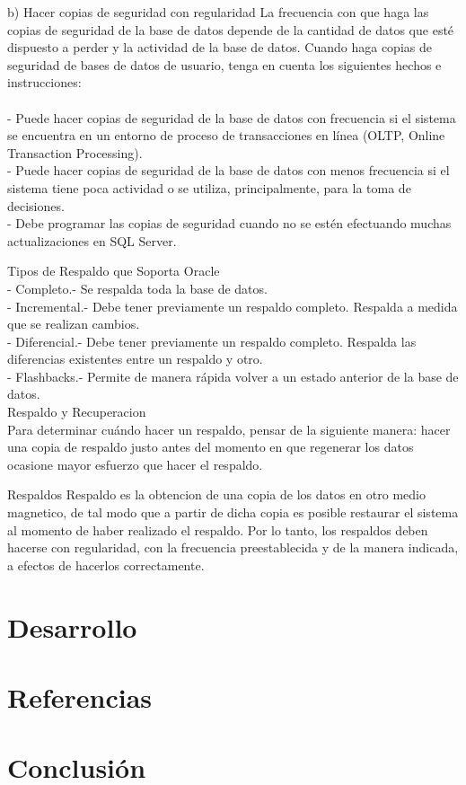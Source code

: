 \documentclass[a4paper,twocolumn,10pt]{article}
\begin{document}
b) Hacer copias de seguridad con regularidad
La frecuencia con que haga las copias de seguridad de la base de datos depende de la cantidad de datos que esté dispuesto a perder y la actividad de la base de datos. Cuando haga copias de seguridad de bases de datos de usuario, tenga en cuenta los siguientes hechos e instrucciones:
\\
\\- Puede hacer copias de seguridad de la base de datos con frecuencia si el sistema se encuentra en un entorno de proceso de transacciones en línea (OLTP, Online Transaction Processing).
\\-	Puede hacer copias de seguridad de la base de datos con menos frecuencia si el sistema tiene poca actividad o se utiliza, principalmente, para la toma de decisiones.
\\-	Debe programar las copias de seguridad cuando no se estén efectuando muchas actualizaciones en SQL Server.

 Tipos de Respaldo que Soporta Oracle
\\-	Completo.- Se respalda toda la base de datos.
\\-	Incremental.- Debe tener previamente un respaldo completo. Respalda a medida que se realizan cambios.
\\-	Diferencial.- Debe tener previamente un respaldo completo. Respalda las diferencias existentes entre un respaldo y otro.
\\-	Flashbacks.- Permite de manera rápida volver a un estado anterior de la base de datos.
	\\ Respaldo y Recuperacion
\\Para determinar cuándo hacer un respaldo, pensar de la siguiente manera: hacer una copia de respaldo justo antes del momento en que regenerar los datos ocasione mayor esfuerzo que hacer el respaldo.

	Respaldos
Respaldo es la obtencion de una copia de los datos en otro medio magnetico, de tal modo que a partir de dicha copia es posible restaurar el sistema al momento de haber realizado el respaldo. Por lo tanto, los respaldos deben hacerse con regularidad, con la frecuencia preestablecida y de la manera indicada, a efectos de hacerlos correctamente.
\\

\section{Desarrollo}
\section{Referencias}
\section{Conclusi\'on}
\end{document}
